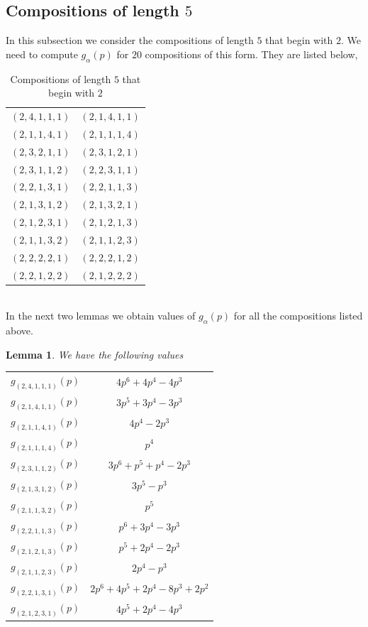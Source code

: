 \documentclass[a4paper]{amsart}
\newtheorem{lemma}[theorem]{Lemma}
\numberwithin{equation}{section}
\theoremstyle{remark}
\begin{document}
\subsection{Compositions of length $5$} 
In this subsection we consider the compositions of length $5$ that begin with $2$. We need to compute  $g_{\alpha}(p)$ for $20$ compositions of this form. They are listed below,\\
\begin{table}[hbt!]
\centering
\begin{tabular}{c c } 
\hline
$(2,4,1,1,1)$ & $(2,1,4,1,1)$\\ 
$(2,1,1,4,1)$ & $(2,1,1,1,4)$\\
$(2,3,2,1,1)$ & $(2,3,1,2,1)$\\
$(2,3,1,1,2)$ & $(2,2,3,1,1)$\\
$(2,2,1,3,1)$ & $(2,2,1,1,3)$\\
$(2,1,3,1,2)$ & $(2,1,3,2,1)$\\
$(2,1,2,3,1)$ & $(2,1,2,1,3)$\\
$(2,1,1,3,2)$ & $(2,1,1,2,3)$\\
$(2,2,2,2,1)$ & $(2,2,2,1,2)$\\
$(2,2,1,2,2)$ & $(2,1,2,2,2)$\\
\hline
\end{tabular}
\caption{Compositions of length $5$ that begin with $2$}
\end{table}\\
In the next two lemmas we obtain values of $g_{\alpha}(p)$ for all the compositions listed above.
\begin{lemma}
We have the following values
\begin{table}[H]
\centering
 \begin{tabular}{c c } 
 \hline
 
 $g_{(2,4,1,1,1)}(p)$ & $4p^6 + 4p^4 - 4p^3$\\ 
 $g_{(2,1,4,1,1)}(p)$ & $3p^5+3p^4-3p^3$\\
 $g_{(2,1,1,4,1)}(p)$ & $4p^4-2p^3$\\
 $g_{(2,1,1,1,4)}(p)$ & $p^4$ \\
 $g_{(2,3,1,1,2)}(p)$ & $3p^6+p^5+p^4-2p^3$ \\
 $g_{(2,1,3,1,2)}(p)$ & $3p^5-p^3$\\
 $g_{(2,1,1,3,2)}(p)$ & $p^5$\\
 $g_{(2,2,1,1,3)}(p)$ & $p^6+3p^4-3p^3$\\
 $g_{(2,1,2,1,3)}(p)$ & $p^5+2p^4-2p^3$\\
 $g_{(2,1,1,2,3)}(p)$ & $2p^4-p^3$\\
 $g_{(2,2,1,3,1)}(p)$ & $2p^6+4p^5+2p^4-8p^3+2p^2$\\
 $g_{(2,1,2,3,1)}(p)$ & $4p^5+2p^4-4p^3$\\
 
\hline
\end{tabular}
\end{table}
\end{lemma}
\end{document}
